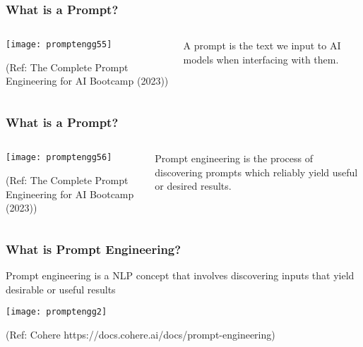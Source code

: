 \begin{frame}[fragile]\frametitle{What is a Prompt?}


\begin{columns}
    \begin{column}[T]{0.6\linewidth}
		\begin{center}
		\texttt{[image: promptengg55]}

		{\tiny (Ref: The Complete Prompt Engineering for AI Bootcamp (2023))}
		\end{center}	
    \end{column}
    \begin{column}[T]{0.4\linewidth}
		A prompt is the text we input to AI models when interfacing with them.
    \end{column}
  \end{columns}
\end{frame}



\begin{frame}[fragile]\frametitle{What is a Prompt?}
\begin{columns}
    \begin{column}[T]{0.6\linewidth}
		\begin{center}
		\texttt{[image: promptengg56]}

		{\tiny (Ref: The Complete Prompt Engineering for AI Bootcamp (2023))}
		\end{center}	
    \end{column}
    \begin{column}[T]{0.4\linewidth}
		Prompt engineering is the process of discovering prompts which reliably yield useful or desired results.
    \end{column}
  \end{columns}
\end{frame}

\begin{frame}[fragile]\frametitle{What is Prompt Engineering?}

Prompt engineering is a NLP concept that involves discovering inputs that yield desirable or useful results


\begin{center}
\texttt{[image: promptengg2]}

{\tiny (Ref: Cohere https://docs.cohere.ai/docs/prompt-engineering)}

\end{center}				
\end{frame}

